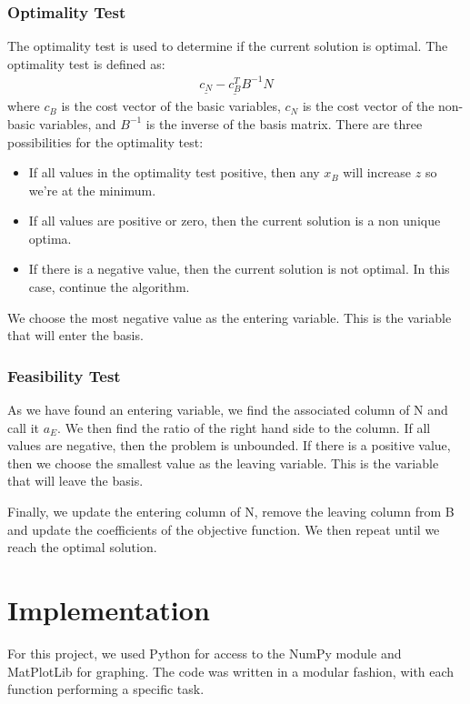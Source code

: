 \documentclass{article}
\numberwithin{equation}{section}
\begin{document}
\subsubsection{Optimality Test}
The optimality test is used to determine if the current solution is optimal. The optimality test is defined as:
\begin{align}
    \underline{c_N} - \underline{c_B^T} B^{-1} N 
\end{align}
where $c_B$ is the cost vector of the basic variables, $c_N$ is the cost vector of the non-basic variables, and $B^{-1}$ is the inverse of the basis matrix.
There are three possibilities for the optimality test:
\begin{itemize}
    \item If all values in the optimality test positive, then any $x_B$ will increase $z$ so we're at the minimum.
    \item If all values are positive or zero, then the current solution is a non unique optima.
    \item If there is a negative value, then the current solution is not optimal. In this case, continue the algorithm.
\end{itemize}
We choose the most negative value as the entering variable. This is the variable that will enter the basis.
\subsubsection{Feasibility Test}
As we have found an entering variable, we find the associated column of N and call it $a_E$. We then find the ratio of the right hand side to the column. If all values are negative, then the problem is unbounded. If there is a positive value, then we choose the smallest value as the leaving variable. This is the variable that will leave the basis.

Finally, we update the entering column of N, remove the leaving column from B and update the coefficients of the objective function. We then repeat until we reach the optimal solution.

\newpage
\section{Implementation}
For this project, we used Python for access to the NumPy module and MatPlotLib for graphing. The code was written in a modular fashion, with each function performing a specific task.
\end{document}
